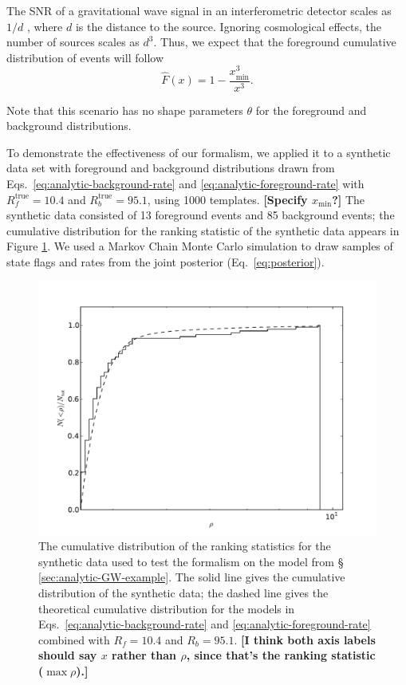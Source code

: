 \documentclass[aps,prd]{revtex4-1}
\newcommand{\xmin}{x_\mathrm{min}}
\newcommand{\ilya}[1]{{\color{red} \bf #1}}
\begin{document}
The SNR of a gravitational wave signal in an interferometric detector
scales as $1/d$ \citep{Finn1992}, where $d$ is the distance to the
source.  Ignoring cosmological effects, the number of sources scales
as $d^3$.  Thus, we expect that the foreground cumulative distribution
of events will follow
\begin{equation}
  \label{eq:analytic-foreground-rate}
  \hat{F}(x) = 1 - \frac{\xmin^3}{x^3}.
\end{equation}

Note that this scenario has no shape parameters $\theta$ for the foreground and
background distributions.

To demonstrate the effectiveness of our formalism, we applied it to a
synthetic data set with foreground and background distributions drawn
from Eqs.~\eqref{eq:analytic-background-rate} and
\eqref{eq:analytic-foreground-rate} with $R_f^\mathrm{true} = 10.4$
and $R_b^\mathrm{true} = 95.1$, using 1000 templates.  \ilya{[Specify
    $\xmin$?]} The synthetic data consisted of 13 foreground events
and 85 background events; the cumulative distribution for the ranking
statistic of the synthetic data appears in Figure
\ref{fig:analytic-data-cumulative}.  We used a Markov Chain Monte
Carlo simulation to draw samples of state flags and rates from the
joint posterior (Eq.~\eqref{eq:posterior}).

\begin{figure}
  \includegraphics[width=\columnwidth]{data}
  \caption{\label{fig:analytic-data-cumulative} The cumulative
    distribution of the ranking statistics for the synthetic data used
    to test the formalism on the model from \S
    \ref{sec:analytic-GW-example}.  The solid line gives the
    cumulative distribution of the synthetic data; the dashed line
    gives the theoretical cumulative distribution for the models in
    Eqs.~\eqref{eq:analytic-background-rate} and
    \eqref{eq:analytic-foreground-rate} combined with $R_f = 10.4$ and
    $R_b = 95.1$. \ilya{[I think both axis labels should say $x$
        rather than $\rho$, since that's the ranking statistic ($\max
        \rho$).]}}
\end{figure}
\end{document}
